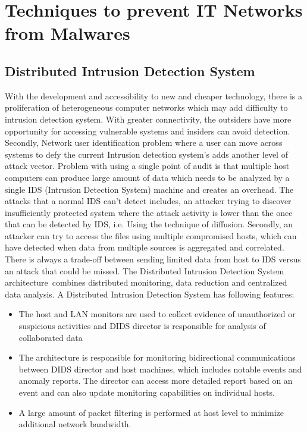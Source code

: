 \documentclass[11pt]{article}
\begin{document}
	\section{Techniques to prevent IT Networks from Malwares}
	\subsection{Distributed Intrusion Detection System}
	With the development and accessibility to new and cheaper technology, there is a proliferation of heterogeneous computer networks which may add difficulty to intrusion detection system. With greater connectivity, the outsiders have more opportunity for accessing vulnerable systems and insiders can avoid detection. Secondly, Network user identification problem where a user can move across systems to defy the current Intrusion detection system's adds another level of attack vector. Problem with using a single point of audit is that multiple host computers can produce large amount of data which needs to be analyzed by a single IDS (Intrusion Detection System) machine and creates an overhead. The attacks that a normal IDS can’t detect includes, an attacker trying to discover insufficiently protected system where the attack activity is lower than the once that can be detected by IDS, i.e. Using the technique of diffusion. Secondly, an attacker can try to access the files using multiple compromised hosts, which can have detected when data from multiple sources is aggregated and correlated. There is always a trade-off between sending limited data from host to IDS versus an attack that could be missed.
	The Distributed Intrusion Detection System architecture~\cite{snapp1991dids}combines distributed monitoring, data reduction and centralized data analysis. A Distributed Intrusion Detection System has following features:
	\begin{itemize}
		\item The host and LAN monitors are used to collect evidence of unauthorized or suspicious activities and DIDS director is responsible for analysis of collaborated data
		\item The architecture is responsible for monitoring bidirectional communications between DIDS director and host machines, which includes notable events and anomaly reports. The director can access more detailed report based on an event and can also update monitoring capabilities on individual hosts.
		\item A large amount of packet filtering is performed at host level to minimize additional network bandwidth.
	\end{itemize}
\end{document}
